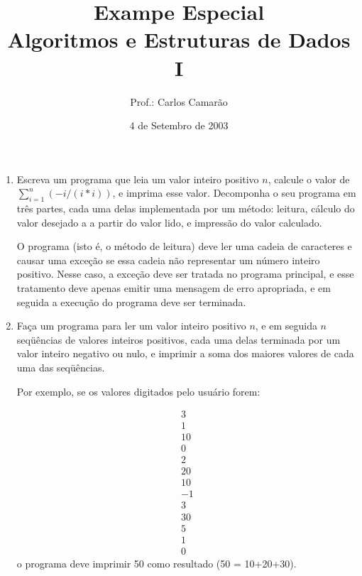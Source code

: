 
\title{Exampe Especial\\ Algoritmos e Estruturas de Dados I}

\pagestyle{empty}	

\author{Prof.: Carlos Camar\~ao}
\date{4 de Setembro de 2003}



\maketitle
\thispagestyle{empty}

\begin{enumerate}

\item Escreva um programa que leia um valor inteiro positivo $n$, 
calcule o valor de $\sum_{i=1}^n (-i/(i*i))$, e imprima esse valor.
Decomponha o seu programa em tr\^es partes, cada uma delas
implementada por um m\'etodo: leitura, c\'alculo do valor desejado a a
partir do valor lido, e impress\~ao do valor calculado.

O programa (isto \'e, o m\'etodo de leitura) deve ler uma cadeia de
caracteres e causar uma exce\c{c}\~ao se essa cadeia n\~ao representar
um n\'umero inteiro positivo. Nesse caso, a exce\c{c}\~ao deve ser
tratada no programa principal, e esse tratamento deve apenas emitir
uma mensagem de erro apropriada, e em seguida a execu\c{c}\~ao do
programa deve ser terminada.

\item Fa\c{c}a um programa para ler um valor inteiro positivo $n$, e
em seguida $n$ seq\"u\^encias de valores inteiros positivos, cada uma
delas terminada por um valor inteiro negativo ou nulo, e imprimir a
soma dos maiores valores de cada uma das seq\"u\^encias. 

Por exemplo, se os valores digitados pelo usu\'ario forem:
  
  \[ \begin{array}{l}
        3    \\
        1    \\
        10   \\
        0    \\
        2    \\
        20   \\
        10   \\
        -1   \\
        3    \\ 
        30   \\
        5    \\
        1    \\
        0    
      \end{array} \]
o programa deve imprimir 50 como resultado (50 = 10+20+30).


\end{enumerate}
